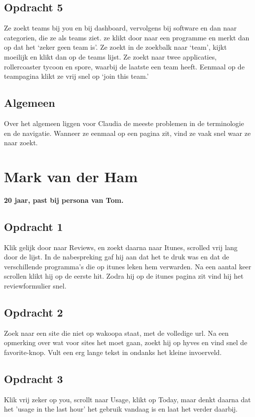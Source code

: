 \subsection{Opdracht 5}
 Ze zoekt teams bij you en bij dashboard, vervolgens bij software en dan naar categorien, die ze als teams ziet. ze klikt door naar een programme en merkt dan op dat het `zeker geen team is'. Ze zoekt in de zoekbalk naar `team', kijkt moeilijk en klikt dan op de teams lijst. Ze zoekt naar twee applicaties, rollercoaster tycoon en spore, waarbij de laatste een team heeft. Eenmaal op de teampagina klikt ze vrij snel op `join this team.'

 \subsection{Algemeen}
  Over het algemeen liggen voor Claudia de meeste problemen in de terminologie en de navigatie. Wanneer ze eenmaal op een pagina zit, vind ze vaak snel waar ze naar zoekt.

\section{Mark van der Ham}
\textbf{20 jaar, past bij persona van Tom.}

\subsection{Opdracht 1}
Klik gelijk door naar Reviews, en zoekt daarna naar Itunes, scrolled vrij lang door de lijst. In de nabespreking gaf hij aan dat het te druk was en dat de verschillende programma's die op itunes leken hem verwarden. Na een aantal keer scrollen klikt hij op de eerste hit. Zodra hij op de itunes pagina zit vind hij het reviewformulier snel.

\subsection{Opdracht 2}
Zoek naar een site die niet op wakoopa staat, met de volledige url. Na een opmerking over wat voor sites het moet gaan, zoekt hij op hyves en vind snel de favorite-knop. Vult een erg lange tekst in ondanks het kleine invoerveld.

\subsection{Opdracht 3}
Klik vrij zeker op you, scrollt naar Usage, klikt op Today, maar denkt daarna dat het 'usage in the last hour' het gebruik vandaag is en laat het verder daarbij.

